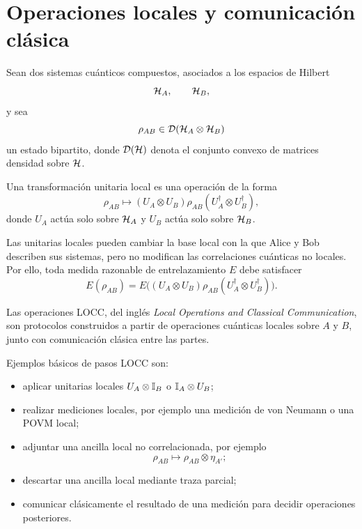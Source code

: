 \documentclass[../main.tex]{subfiles}
\begin{document}
\section{Operaciones locales y comunicación clásica}

Sean dos sistemas cuánticos compuestos, asociados a los espacios de Hilbert
\begin{equation*}
    \mathcal{H}_A,\qquad \mathcal{H}_B,
\end{equation*}
y sea
\begin{equation*}
    \rho_{AB}\in\mathcal D(\mathcal{H}_A\otimes\mathcal{H}_B)
\end{equation*}
un estado bipartito, donde \(\mathcal D(\mathcal{H})\) denota el conjunto convexo de matrices densidad sobre \(\mathcal{H}\).

\begin{definicion}
Una transformación unitaria local es una operación de la forma
\begin{equation*}
    \rho_{AB}\longmapsto
    (U_A\otimes U_B)\rho_{AB}(U_A^\dagger\otimes U_B^\dagger),
\end{equation*}
donde \(U_A\) actúa solo sobre \(\mathcal{H}_A\) y \(U_B\) actúa solo sobre \(\mathcal{H}_B\).
\end{definicion}

Las unitarias locales pueden cambiar la base local con la que Alice y Bob describen sus sistemas, pero no modifican las correlaciones cuánticas no locales. Por ello, toda medida razonable de entrelazamiento \(E\) debe satisfacer
\begin{equation}
    E(\rho_{AB})=
    E\!\bigl((U_A\otimes U_B)\rho_{AB}(U_A^\dagger\otimes U_B^\dagger)\bigr).
    \label{eq:invarianza-unitarias-locales}
\end{equation}

\begin{definicion}[LOCC]
Las operaciones LOCC, del inglés \emph{Local Operations and Classical Communication}, son protocolos construidos a partir de operaciones cuánticas locales sobre \(A\) y \(B\), junto con comunicación clásica entre las partes.
\end{definicion}

Ejemplos básicos de pasos LOCC son:
\begin{itemize}
    \item aplicar unitarias locales \(U_A\otimes\mathbb{I}_B\) o \(\mathbb{I}_A\otimes U_B\);
    \item realizar mediciones locales, por ejemplo una medición de von Neumann o una POVM local;
    \item adjuntar una ancilla local no correlacionada, por ejemplo
    \begin{equation*}
        \rho_{AB}\longmapsto \rho_{AB}\otimes\eta_{A'};
    \end{equation*}
    \item descartar una ancilla local mediante traza parcial;
    \item comunicar clásicamente el resultado de una medición para decidir operaciones posteriores.
\end{itemize}
\end{document}
